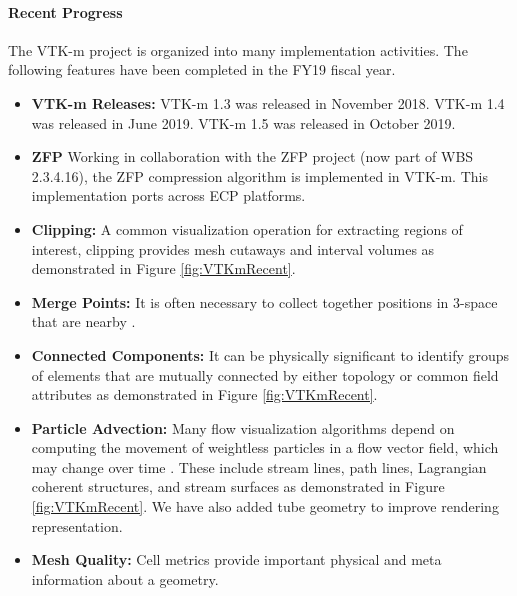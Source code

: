 \paragraph{Recent Progress}
The VTK-m project is organized into many implementation activities.
The following features have been completed in the FY19 fiscal year.

\begin{itemize}
\item \textbf{VTK-m Releases:}
  VTK-m 1.3 was released in November 2018.
  VTK-m 1.4 was released in June 2019.
  VTK-m 1.5 was released in October 2019.
\item \textbf{ZFP}
  Working in collaboration with the ZFP project (now part of WBS 2.3.4.16), the ZFP compression algorithm \cite{zfp-jsm2017} is implemented in VTK-m.
  This implementation ports across ECP platforms.
\item \textbf{Clipping:}
  A common visualization operation for extracting regions of interest, clipping provides mesh cutaways and interval volumes as demonstrated in Figure \ref{fig:VTKmRecent}.
\item \textbf{Merge Points:}
  It is often necessary to collect together positions in 3-space that are nearby \cite{Yenpure2019}.
\item \textbf{Connected Components:}
  It can be physically significant to identify groups of elements that are mutually connected by either topology or common field attributes as demonstrated in Figure \ref{fig:VTKmRecent}.
\item \textbf{Particle Advection:}
  Many flow visualization algorithms depend on computing the movement of weightless particles in a flow vector field, which may change over time \cite{Pugmire2018}.
  These include stream lines, path lines, Lagrangian coherent structures, and stream surfaces as demonstrated in Figure \ref{fig:VTKmRecent}.
  We have also added tube geometry to improve rendering representation.
\item \textbf{Mesh Quality:}
  Cell metrics provide important physical and meta information about a geometry.

\end{itemize}
